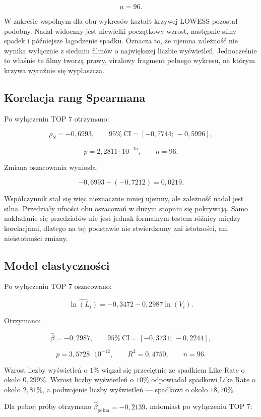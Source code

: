 \documentclass[12pt,a4paper]{article}
\begin{document}
\[
n=96.
\]

W zakresie wspólnym dla obu wykresów kształt krzywej LOWESS pozostał podobny. Nadal widoczny jest niewielki początkowy wzrost, następnie silny spadek i późniejsze łagodzenie spadku. Oznacza to, że ujemna zależność nie wynika wyłącznie z siedmiu filmów o największej liczbie wyświetleń. Jednocześnie to właśnie te filmy tworzą prawy, viralowy fragment pełnego wykresu, na którym krzywa wyraźnie się wypłaszcza.

\subsection{Korelacja rang Spearmana}

\noindent
Po wyłączeniu TOP 7 otrzymano:

\[
\rho_S=-0{,}6993,
\qquad
95\%\ \mathrm{CI}=[-0{,}7744;\,-0{,}5996],
\]

\[
p=2{,}2811\cdot 10^{-15},
\qquad
n=96.
\]

Zmiana oszacowania wyniosła:

\[
-0{,}6993-(-0{,}7212)=0{,}0219.
\]

Współczynnik stał się więc nieznacznie mniej ujemny, ale zależność nadal jest silna. Przedziały ufności obu oszacowań w dużym stopniu się pokrywają. Samo nakładanie się przedziałów nie jest jednak formalnym testem różnicy między korelacjami, dlatego na tej podstawie nie stwierdzamy ani istotności, ani nieistotności zmiany.

\subsection{Model elastyczności}

\noindent
Po wyłączeniu TOP 7 oszacowano:

\[
\widehat{\ln(L_i)}
=
-0{,}3472-0{,}2987\ln(V_i).
\]

Otrzymano:

\[
\widehat{\beta}=-0{,}2987,
\qquad
95\%\ \mathrm{CI}=[-0{,}3731;\,-0{,}2244],
\]

\[
p=3{,}5728\cdot 10^{-12},
\qquad
R^2=0{,}4750,
\qquad
n=96.
\]

Wzrost liczby wyświetleń o $1\%$ wiązał się przeciętnie ze spadkiem Like Rate o około $0{,}299\%$. Wzrost liczby wyświetleń o $10\%$ odpowiadał spadkowi Like Rate o około $2{,}81\%$, a podwojenie liczby wyświetleń --- spadkowi o około $18{,}70\%$.

Dla pełnej próby otrzymano $\widehat{\beta}_{\text{pełna}}=-0{,}2139$, natomiast po wyłączeniu TOP 7:
\end{document}
